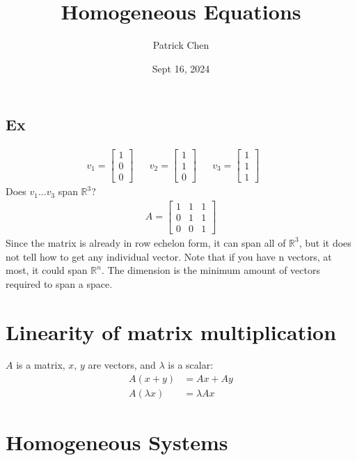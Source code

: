 \documentclass{article}
\title{Homogeneous Equations}
\author{Patrick Chen}
\date{Sept 16, 2024}
\theoremstyle{mytheoremstyle}
\theoremstyle{mytheoremstyle}
\theoremstyle{myproblemstyle}
\begin{document}
    \maketitle
    \subsection*{Ex}
    \begin{align*}
        v_1 = \begin{bmatrix}
            1 \\ 0 \\ 0
        \end{bmatrix} &&
        v_2 = \begin{bmatrix}
            1 \\ 1 \\ 0
        \end{bmatrix} &&
        v_3 = \begin{bmatrix}
            1 \\ 1 \\ 1
        \end{bmatrix} &&
    \end{align*}
    Does $v_1\dots v_3$ span $\mathbb{R}^3$?
    \begin{align*}
        A = \begin{bmatrix}
            1 & 1 & 1 \\
            0 & 1 & 1 \\
            0 & 0 & 1
        \end{bmatrix}
    \end{align*}
    Since the matrix is already in row echelon form, it can span all of
    $\mathbb{R}^3$, but it does not tell how to get any individual vector. Note
    that if you have n vectors, at most, it could span $\mathbb{R}^n$. The
    dimension is the minimum amount of vectors required to span a space.

    \section*{Linearity of matrix multiplication}
    $A$ is a matrix, $x$, $y$ are vectors, and $\lambda$ is a scalar:
    \begin{align*}
        A(x+y) &= Ax+Ay \\
        A(\lambda x) &= \lambda Ax
    \end{align*}

    \section*{Homogeneous Systems}
\end{document}
